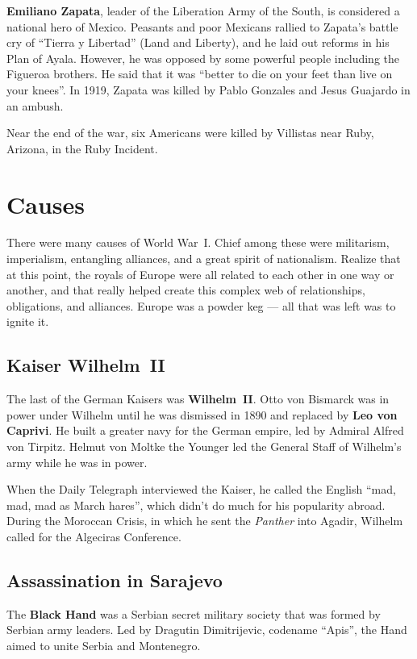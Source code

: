 \textbf{Emiliano Zapata}, leader of the Liberation Army of the South,
is considered a national hero of Mexico.
Peasants and poor Mexicans rallied to Zapata's battle cry of ``Tierra y Libertad'' (Land and Liberty),
and he laid out reforms in his Plan of Ayala.
However, he was opposed by some powerful people including the Figueroa brothers.
He said that it was ``better to die on your feet than live on your knees''.
In 1919, Zapata was killed by Pablo Gonzales and Jesus Guajardo in an ambush.

Near the end of the war, six Americans were killed by Villistas near Ruby, Arizona, in the Ruby Incident.

\section{Causes}

There were many causes of World War~I.
Chief among these were militarism, imperialism, entangling alliances, and a great spirit of nationalism.
Realize that at this point, the royals of Europe were all related to each other in one way or another,
and that really helped create this complex web of relationships, obligations, and alliances.
Europe was a powder keg --- all that was left was to ignite it.

\subsection*{Kaiser Wilhelm~II}

The last of the German Kaisers was \textbf{Wilhelm~II}.
Otto von Bismarck was in power under Wilhelm until he was dismissed in 1890
and replaced by \textbf{Leo von Caprivi}.
He built a greater navy for the German empire, led by Admiral Alfred von Tirpitz.
Helmut von Moltke the Younger led the General Staff of Wilhelm's army while he was in power.

When the Daily Telegraph interviewed the Kaiser,
he called the English ``mad, mad, mad as March hares'', which didn't do much for his popularity abroad.
During the Moroccan Crisis, in which he sent the \textit{Panther} into Agadir,
Wilhelm called for the Algeciras Conference.

\subsection*{Assassination in Sarajevo}

The \textbf{Black Hand} was a Serbian secret military society that was formed by Serbian army leaders.
Led by Dragutin Dimitrijevic, codename ``Apis'', the Hand aimed to unite Serbia and Montenegro.

